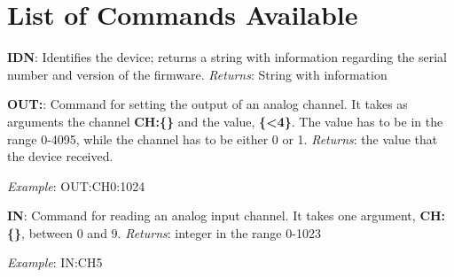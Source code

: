\section{List of Commands Available}\label{list-of-commandsavailable}
\textbf{{IDN}}: Identifies the device; returns a string with information regarding the serial number and version of the firmware. \emph{Returns}: String with information

\textbf{{OUT}:}: Command for setting the output of an analog channel. It takes as arguments the channel \textbf{{CH}:\{\}} and the value, \textbf{\{\textless{}4\}}. The value has to be in the range 0-4095, while the channel has to be either 0 or 1. \emph{Returns}: the value that the device received.

\emph{Example}: {OUT}:{CH0}:1024

\textbf{{IN}}: Command for reading an analog input channel. It takes one argument, \textbf{{CH}:\{\}}, between 0 and 9. \emph{Returns}: integer in the range 0-1023

\emph{Example}: {IN}:{CH5}
